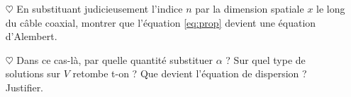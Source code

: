 \documentclass{report}
\begin{document}
\begin{itemize}

	\item[$\heartsuit$] En substituant judicieusement l'indice $n$ par la dimension spatiale $x$ le long du câble coaxial, montrer que l'équation \ref{eq:prop} devient une équation d'Alembert.
	
	\item[$\heartsuit$] Dans ce cas-là, par quelle quantité substituer $\alpha$ ? Sur quel type de solutions sur $V$ retombe t-on ? Que devient l'équation de dispersion ? Justifier. 

\end{itemize}
\end{document}
